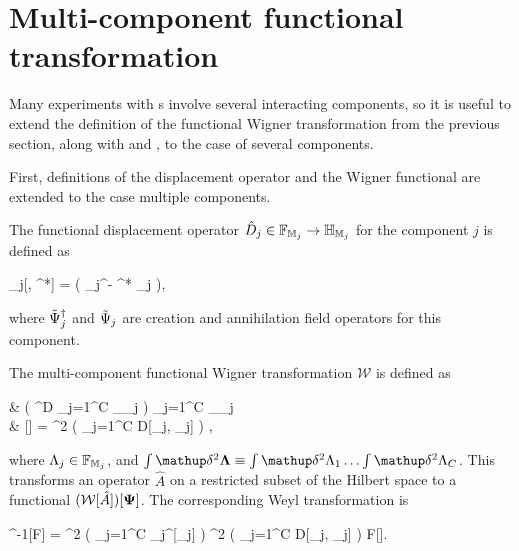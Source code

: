 \section{Multi-component functional transformation}

Many experiments with s involve several interacting components, so it is useful to extend the definition of the functional Wigner transformation from the previous section, along with  and , to the case of several components.

First, definitions of the displacement operator and the Wigner functional are extended to the case multiple components.

\begin{definition}
	The functional displacement operator $\hat{D}_j \in \mathbb{F}_{\mathbb{M}_j} \rightarrow \mathbb{H}_{\mathbb{M}_j}$ for the component $j$ is defined as
	\begin{eqn*}
		_j[\Lambda, \Lambda^*] = \exp \int \upd\xvec \left(
			\Lambda \Psiop_j^\dagger - \Lambda^* \Psiop_j
		\right),
	\end{eqn*}
	where $\tilde{\Psi}_j^\dagger$ and $\tilde{\Psi}_j$ are creation and annihilation field operators for this component.
\end{definition}

\begin{definition}
\label{def:wigner:mc:w-transformation}
	The multi-component functional Wigner transformation $\mathcal{W}$ is defined as
	\begin{eqn*}
		&  \in \left( ^D \rightarrow \prod_{j=1}^C _{\restbasis_j} \right)
			\rightarrow \prod_{j=1}^C _{\restbasis_j}
			\rightarrow \mathbb{C} \\
		& [\hat{A}]
		=  \int \fdelta^2 \bLambda
			\left( \prod_{j=1}^C D[\Lambda_j, \Psi_j] \right)
			\Trace{ \hat{A} \prod_{j=1}^C \hat{D}_j[\Lambda_j] },
	\end{eqn*}
	where $\Lambda_j \in \mathbb{F}_{\mathbb{M}_j}$, and $\int \fdelta^2 \bLambda \equiv \int \fdelta^2 \Lambda_1 \ldots \int \fdelta^2 \Lambda_C$.
	This transforms an operator $\hat{A}$ on a restricted subset of the Hilbert space to a functional $(\mathcal{W}[\hat{A}])[\mathbf{\Psi}]$.
	The corresponding Weyl transformation is
	\begin{eqn*}
		^{-1}[F]
		=  \int \fdelta^2 \bXi
			\left( \prod_{j=1}^C _j^{\dagger}[\Xi_j] \right)
			\int \fdelta^2 \bPhi
				\left( \prod_{j=1}^C D[\Phi_j, \Xi_j] \right)
				F[\bPhi].
	\end{eqn*}
\end{definition}

